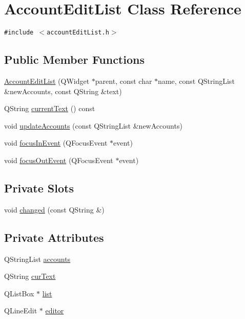 \hypertarget{classAccountEditList}{
\section{Account\-Edit\-List Class Reference}
\label{classAccountEditList}
}
{\tt \#include $<$account\-Edit\-List.h$>$}

\subsection*{Public Member Functions}
\begin{CompactItemize}
\item 
\hyperlink{classAccountEditList_a0}{Account\-Edit\-List} (QWidget $\ast$parent, const char $\ast$name, const QString\-List \&new\-Accounts, const QString \&text)
\item 
QString \hyperlink{classAccountEditList_a1}{current\-Text} () const
\item 
void \hyperlink{classAccountEditList_a2}{update\-Accounts} (const QString\-List \&new\-Accounts)
\item 
void \hyperlink{classAccountEditList_a3}{focus\-In\-Event} (QFocus\-Event $\ast$event)
\item 
void \hyperlink{classAccountEditList_a4}{focus\-Out\-Event} (QFocus\-Event $\ast$event)
\end{CompactItemize}
\subsection*{Private Slots}
\begin{CompactItemize}
\item 
void \hyperlink{classAccountEditList_k0}{changed} (const QString \&)
\end{CompactItemize}
\subsection*{Private Attributes}
\begin{CompactItemize}
\item 
QString\-List \hyperlink{classAccountEditList_r0}{accounts}
\item 
QString \hyperlink{classAccountEditList_r1}{cur\-Text}
\item 
QList\-Box $\ast$ \hyperlink{classAccountEditList_r2}{list}
\item 
QLine\-Edit $\ast$ \hyperlink{classAccountEditList_r3}{editor}
\end{CompactItemize}


